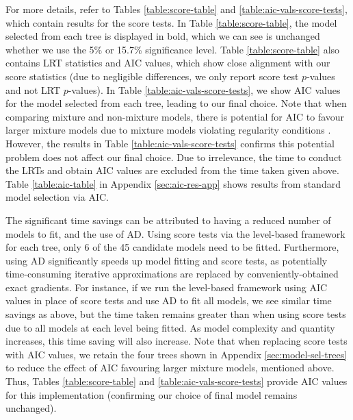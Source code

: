 \documentclass{article}
\begin{document}
For more details, refer to Tables \ref{table:score-table} and
\ref{table:aic-vals-score-tests}, which contain results for
the score tests. In Table \ref{table:score-table}, the
model selected from each tree is displayed in bold, which we can see is
unchanged whether we use the 5\% or 15.7\% significance 
level. Table \ref{table:score-table} also contains LRT statistics
and AIC values, which show close alignment with our score
statistics (due to negligible differences, we only report
score test  $p$-values and not LRT $p$-values). In Table
\ref{table:aic-vals-score-tests}, we show AIC values for the model
selected from each tree, leading to our final choice. Note that
when comparing mixture and non-mixture models, there is potential for
AIC to favour larger mixture models due to mixture models violating
regularity conditions \parencite{mcL-Peel2000}. However, the results
in Table \ref{table:aic-vals-score-tests} confirms this potential
problem does not affect our final choice. Due to
irrelevance, the time to conduct the LRTs and obtain AIC 
values are excluded from the time taken given above. Table \ref{table:aic-table} in Appendix
\ref{sec:aic-res-app} shows results from standard model selection via
AIC. %



The significant time savings can be attributed to having a reduced number
of models to fit, and the use of AD. Using score tests via the level-based
framework for each tree, only 6 of the 45 candidate models need to be
fitted. Furthermore, using AD significantly speeds up model fitting
and score tests, as potentially time-consuming iterative
approximations are replaced by conveniently-obtained exact
gradients. For instance, if we run the level-based framework using
AIC values in place of score tests and use AD to fit all models, we
see similar time savings as above, but the time taken remains greater than
when using score tests due to all models at each level
being fitted. As model complexity and quantity increases,
this time saving will also increase. Note that when replacing score
tests with AIC values, we retain the four trees shown in Appendix
\ref{sec:model-sel-trees} to reduce the effect
of AIC favouring larger mixture models, mentioned above. Thus, Tables
\ref{table:score-table} and \ref{table:aic-vals-score-tests} provide
AIC values for this implementation (confirming our choice of final
model remains unchanged). 
\end{document}

